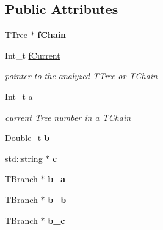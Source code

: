\subsection*{Public Attributes}
\begin{DoxyCompactItemize}
\item 
\hypertarget{classExampleRoot_a4717cece1b2513740bf12fe1b1f269cc}{T\-Tree $\ast$ {\bfseries f\-Chain}}\label{classExampleRoot_a4717cece1b2513740bf12fe1b1f269cc}

\item 
\hypertarget{classExampleRoot_aae45e22777e3dec49bc68fae4850cf63}{Int\-\_\-t \hyperlink{classExampleRoot_aae45e22777e3dec49bc68fae4850cf63}{f\-Current}}\label{classExampleRoot_aae45e22777e3dec49bc68fae4850cf63}

\begin{DoxyCompactList}\small\item\em pointer to the analyzed T\-Tree or T\-Chain \end{DoxyCompactList}\item 
\hypertarget{classExampleRoot_a184637f032bbd33058f288c631ad4b08}{Int\-\_\-t \hyperlink{classExampleRoot_a184637f032bbd33058f288c631ad4b08}{a}}\label{classExampleRoot_a184637f032bbd33058f288c631ad4b08}

\begin{DoxyCompactList}\small\item\em current Tree number in a T\-Chain \end{DoxyCompactList}\item 
\hypertarget{classExampleRoot_a906499b01132e5c5e9c220ee2e7d75dd}{Double\-\_\-t {\bfseries b}}\label{classExampleRoot_a906499b01132e5c5e9c220ee2e7d75dd}

\item 
\hypertarget{classExampleRoot_aad0a4cee176922682ae2330e1613c978}{std\-::string $\ast$ {\bfseries c}}\label{classExampleRoot_aad0a4cee176922682ae2330e1613c978}

\item 
\hypertarget{classExampleRoot_adbbc71a9b714437196324a5144ba38d6}{T\-Branch $\ast$ {\bfseries b\-\_\-a}}\label{classExampleRoot_adbbc71a9b714437196324a5144ba38d6}

\item 
\hypertarget{classExampleRoot_a8c1be09581a81eb61c945ee01894f078}{T\-Branch $\ast$ {\bfseries b\-\_\-b}}\label{classExampleRoot_a8c1be09581a81eb61c945ee01894f078}

\item 
\hypertarget{classExampleRoot_ab3c9727dc708989f36140651ec6a898c}{T\-Branch $\ast$ {\bfseries b\-\_\-c}}\label{classExampleRoot_ab3c9727dc708989f36140651ec6a898c}

\end{DoxyCompactItemize}
